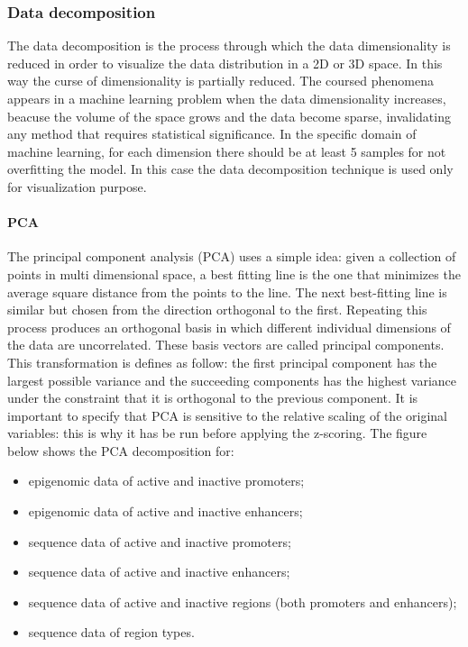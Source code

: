 \subsubsection{Data decomposition}

The data decomposition is the process through which the data
dimensionality is reduced in order to visualize the data distribution in
a 2D or 3D space. In this way the curse of dimensionality is partially
reduced. The coursed phenomena appears in a machine learning problem
when the data dimensionality increases, beacuse the volume of the space
grows and the data become sparse, invalidating any method that requires
statistical significance. In the specific domain of machine learning,
for each dimension there should be at least 5 samples for not
overfitting the model. In this case the data decomposition technique is
used only for visualization purpose.

\paragraph{PCA}

The principal component analysis (PCA) uses a simple idea: given a
collection of points in multi dimensional space, a best fitting line is
the one that minimizes the average square distance from the points to
the line. The next best-fitting line is similar but chosen from the
direction orthogonal to the first. Repeating this process produces an
orthogonal basis in which different individual dimensions of the data
are uncorrelated. These basis vectors are called principal components.
This transformation is defines as follow: the first principal component
has the largest possible variance and the succeeding components has the
highest variance under the constraint that it is orthogonal to the
previous component. It is important to specify that PCA is sensitive to
the relative scaling of the original variables: this is why it has be
run before applying the z-scoring. The figure below shows the PCA
decomposition for:

\begin{itemize}
\item
  epigenomic data of active and inactive promoters;
\item
  epigenomic data of active and inactive enhancers;
\item
  sequence data of active and inactive promoters;
\item
  sequence data of active and inactive enhancers;
\item
  sequence data of active and inactive regions (both promoters and
  enhancers);
\item
  sequence data of region types.
\end{itemize}

